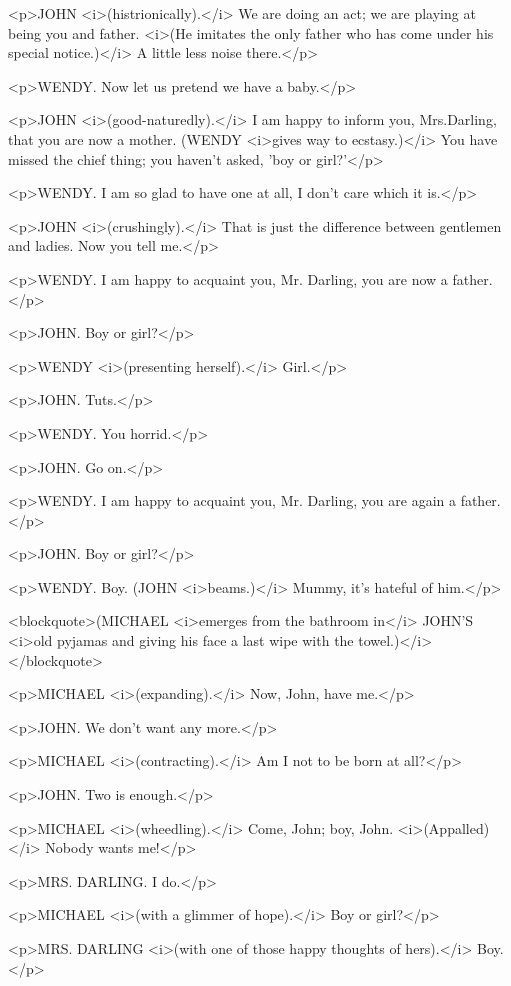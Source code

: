 <p>JOHN <i>(histrionically).</i> We are doing an act; we are playing
at being you and father. <i>(He imitates the only father who has come
under his special notice.)</i> A little less noise there.</p>

<p>WENDY. Now let us pretend we have a baby.</p>

<p>JOHN <i>(good-naturedly).</i> I am happy to inform you,
Mrs.Darling, that you are now a mother. (WENDY <i>gives way to
ecstasy.)</i> You have missed the chief thing; you haven't asked,
'boy or girl?'</p>

<p>WENDY. I am so glad to have one at all, I don't care which it
is.</p>

<p>JOHN <i>(crushingly).</i> That is just the difference between
gentlemen and ladies. Now you tell me.</p>

<p>WENDY. I am happy to acquaint you, Mr. Darling, you are now a
father.</p>

<p>JOHN. Boy or girl?</p>

<p>WENDY <i>(presenting herself).</i> Girl.</p>

<p>JOHN. Tuts.</p>

<p>WENDY. You horrid.</p>

<p>JOHN. Go on.</p>

<p>WENDY. I am happy to acquaint you, Mr. Darling, you are again a
father.</p>

<p>JOHN. Boy or girl?</p>

<p>WENDY. Boy. (JOHN <i>beams.)</i> Mummy, it's hateful of him.</p>

<blockquote>(MICHAEL <i>emerges from the bathroom in</i> JOHN'S
<i>old pyjamas and giving his face a last wipe with the
towel.)</i></blockquote>

<p>MICHAEL <i>(expanding).</i> Now, John, have me.</p>

<p>JOHN. We don't want any more.</p>

<p>MICHAEL <i>(contracting).</i> Am I not to be born at all?</p>

<p>JOHN. Two is enough.</p>

<p>MICHAEL <i>(wheedling).</i> Come, John; boy, John.
<i>(Appalled)</i> Nobody wants me!</p>

<p>MRS. DARLING. I do.</p>

<p>MICHAEL <i>(with a glimmer of hope).</i> Boy or girl?</p>

<p>MRS. DARLING <i>(with one of those happy thoughts of hers).</i>
Boy.</p>


